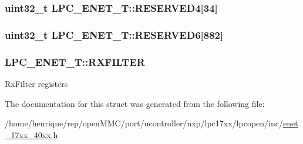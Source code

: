 \hypertarget{structLPC__ENET__T_a21834684d9ccdf758a76d847fce309d1}{
\subsubsection[{R\-E\-S\-E\-R\-V\-E\-D4}]{\setlength{\rightskip}{0pt plus 5cm}uint32\-\_\-t L\-P\-C\-\_\-\-E\-N\-E\-T\-\_\-\-T\-::\-R\-E\-S\-E\-R\-V\-E\-D4\mbox{[}34\mbox{]}}}\label{structLPC__ENET__T_a21834684d9ccdf758a76d847fce309d1}
\hypertarget{structLPC__ENET__T_a69971bdb50272af4d797c243b68a640a}{
\subsubsection[{R\-E\-S\-E\-R\-V\-E\-D6}]{\setlength{\rightskip}{0pt plus 5cm}uint32\-\_\-t L\-P\-C\-\_\-\-E\-N\-E\-T\-\_\-\-T\-::\-R\-E\-S\-E\-R\-V\-E\-D6\mbox{[}882\mbox{]}}}\label{structLPC__ENET__T_a69971bdb50272af4d797c243b68a640a}
\hypertarget{structLPC__ENET__T_a4076c6a080ba8b6e6e7af7343408080b}{
\subsubsection[{R\-X\-F\-I\-L\-T\-E\-R}]{ L\-P\-C\-\_\-\-E\-N\-E\-T\-\_\-\-T\-::\-R\-X\-F\-I\-L\-T\-E\-R}}\label{structLPC__ENET__T_a4076c6a080ba8b6e6e7af7343408080b}
Rx\-Filter registers 

The documentation for this struct was generated from the following file\-:\begin{DoxyCompactItemize}
\item 
/home/henrique/rep/open\-M\-M\-C/port/ucontroller/nxp/lpc17xx/lpcopen/inc/\hyperlink{enet__17xx__40xx_8h}{enet\-\_\-17xx\-\_\-40xx.\-h}\end{DoxyCompactItemize}
